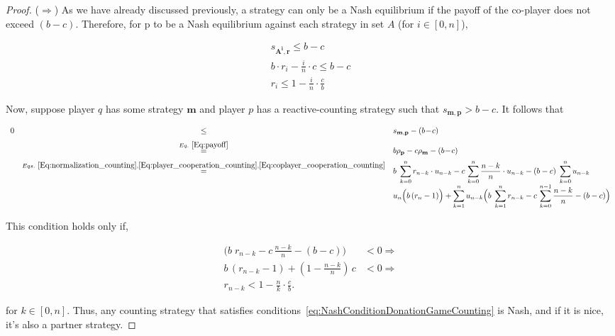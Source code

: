\documentclass{article}
\theoremstyle{definition}
\begin{document}
\begin{proof}
($\Rightarrow$) As we have already discussed previously, a strategy can only be
a Nash equilibrium if the payoff of the co-player does not exceed $(b - c)$.
Therefore, for p to be a Nash equilibrium against each strategy in set $A$ (for
$i \in [0, n]$),

\begin{align}\label{eq:NashConditionDonationGameCounting}
  s_{\mathbf{A^{i}}, \mathbf{r}} \leq b - c \\ 
  b \cdot r_i - \frac{i}{n} \cdot c \leq   b - c \\
  r_i \leq 1 - \frac{i}{n} \cdot \frac{c}{b}
\end{align}

Now, suppose player $q$ has some strategy $\mathbf{m}$ and player $p$ has a reactive-counting
strategy such that $s_{\mathbf{m}, \mathbf{p}} > b\!-\!c$. It follows that

\begin{equation}
\begin{array}{rcl}
0 	&\le	&s_{\mathbf{m}, \mathbf{p}}-(b\!-\!c)\\[0.2cm]
  &\stackrel{Eq.~\eqref{Eq:payoff}}{=}	&b\rho_\mathbf{p} - c\rho_\mathbf{m}-(b\!-\!c)\\[0.2cm]
  &\stackrel{Eqs.~\eqref{Eq:normalization_counting}, \eqref{Eq:player_cooperation_counting}, \eqref{Eq:coplayer_cooperation_counting}}{=}	& 
  \displaystyle b\; \sum_{k=0}^{n} r_{n - k} \cdot u_{n - k} - c\, \sum_{k=0}^{n} \frac{n - k}{n} \cdot u_{n - k} - (b - c)\; \sum_{k=0}^{n} u_{n - k}\\[0.2cm]
  & & \displaystyle  u_{n} \Big(b\, (r_n - 1) \Big) +  \sum_{k=1}^{n} u_{n - k} \Big(b\; \sum_{k=1}^{n} r_{n - k} - c\, \sum_{k=0}^{n - 1} \frac{n - k}{n} - (b - c)\Big)
\end{array}
\end{equation}

This condition holds only if,

\begin{align}
  \Big(b\; r_{n - k} - c\, \frac{n - k}{n} - (b - c)\Big) & < 0 \Rightarrow \\ 
  b \, (r_{n - k} - 1) + (1 - \frac{n - k}{n})\, c & < 0 \Rightarrow \\ 
  r_{n - k} < 1 - \frac{n}{k} \cdot \frac{c}{b}.
\end{align}

for $k \in [0, n]$. Thus, any counting strategy that satisfies conditions~\eqref{eq:NashConditionDonationGameCounting}
is Nash, and if it is nice, it's also a partner strategy.
\end{proof}
\end{document}
